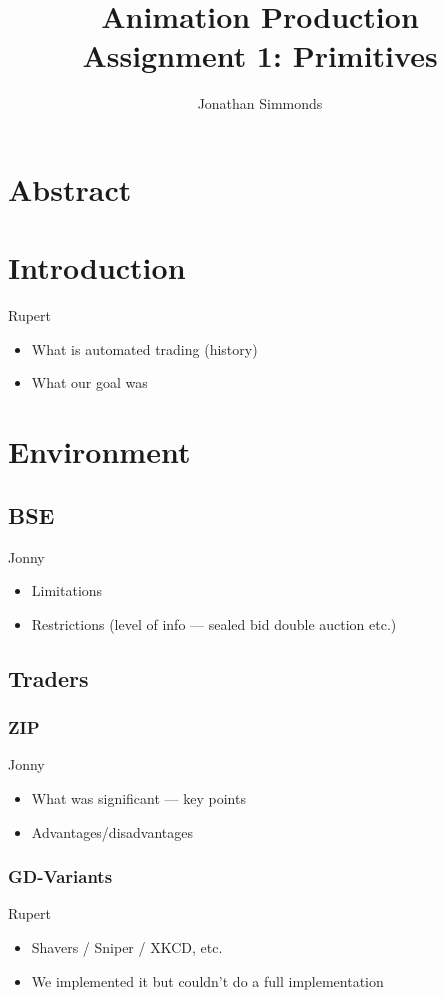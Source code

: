 \documentclass[12pt]{article} %
\title{Animation Production\\Assignment 1: Primitives}
\author{Jonathan Simmonds}
\date{} %
\begin{document}
\maketitle{}
\vspace{4cm}

\pagebreak

\section{Abstract}


\section{Introduction}
Rupert
\begin{itemize} \itemsep0pt
	\item What is automated trading (history)
	\item What our goal was
\end{itemize}


\section{Environment}
\subsection{BSE}
Jonny
\begin{itemize} \itemsep0pt
	\item Limitations
	\item Restrictions (level of info --- sealed bid double auction etc.)
\end{itemize}

\subsection{Traders}
\subsubsection{ZIP}
Jonny
\begin{itemize} \itemsep0pt
	\item What was significant --- key points
	\item Advantages/disadvantages
\end{itemize}

\subsubsection{GD-Variants}
Rupert
\begin{itemize} \itemsep0pt
	\item Shavers / Sniper / XKCD, etc.
	\item We implemented it but couldn't do a full implementation
\end{itemize}
\end{document}
